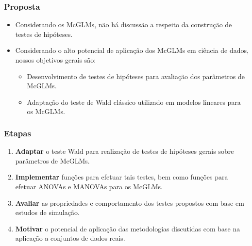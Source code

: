 \documentclass[10pt,
  aspectratio=169,
  serif,
  mathserif,
  professionalfont,
  compress,
  handout,
  ]{beamer}\usepackage[]{graphicx}\usepackage[]{color}
\begin{document}

\begin{frame}
  \frametitle{Proposta}

\begin{itemize}

  \itemsep 2ex
  
  \item Considerando os McGLMs, não há discussão a respeito da construção de testes de hipóteses.
  
  \item Considerando o alto potencial de aplicação dos McGLMs em ciência de dados, nossos objetivos gerais são:

  \begin{itemize}
  
  \itemsep 2ex
  
  \item Desenvolvimento de testes de hipóteses para avaliação dos parâmetros de McGLMs.

  \item Adaptação do teste de Wald clássico utilizado em modelos lineares para os McGLMs. 

  \end{itemize}
  
\end{itemize}

\end{frame}


\begin{frame}
  \frametitle{Etapas}

  \begin{enumerate}
    \itemsep 2ex

  \item \textbf{Adaptar} o teste Wald para realização de testes de hipóteses gerais sobre parâmetros de McGLMs. 
  
  \item \textbf{Implementar} funções para efetuar tais testes, bem como funções para efetuar ANOVAs e MANOVAs para os McGLMs. 

  \item \textbf{Avaliar} as propriedades e comportamento dos testes propostos com base em estudos de simulação.

  \item \textbf{Motivar} o potencial de aplicação das metodologias discutidas com base na aplicação a conjuntos de dados reais.

  \end{enumerate}

\end{frame}
\end{document}
